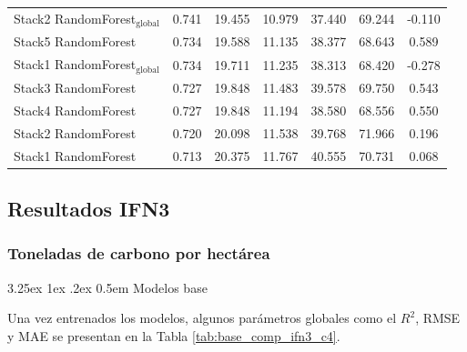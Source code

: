 \documentclass[a4paper,twocolumn]{article}
\makeatletter
\renewcommand\paragraph{\@startsection{paragraph}{4}{\z@}%
  {3.25ex \@plus1ex \@minus.2ex}%
  {0.5em}%
  {\normalfont\normalsize\bfseries}}
\newcommand{\subsubsubsection}[1]{\paragraph{#1}}
\makeatother
\begin{document}
\begin{table}
{\begin{tabular}{p{4.5cm}cccccc}
        Stack2 RandomForest$_{\text{global}}$ & 0.741 & 19.455 & 10.979 & 37.440 & 69.244 & -0.110 \\
        Stack5 RandomForest & 0.734 & 19.588 & 11.135 & 38.377 & 68.643 & 0.589 \\
        Stack1 RandomForest$_{\text{global}}$ & 0.734 & 19.711 & 11.235 & 38.313 & 68.420 & -0.278 \\
        Stack3 RandomForest & 0.727 & 19.848 & 11.483 & 39.578 & 69.750 & 0.543 \\
        Stack4 RandomForest & 0.727 & 19.848 & 11.194 & 38.580 & 68.556 & 0.550 \\
        Stack2 RandomForest & 0.720 & 20.098 & 11.538 & 39.768 & 71.966 & 0.196 \\
        Stack1 RandomForest & 0.713 & 20.375 & 11.767 & 40.555 & 70.731 & 0.068 \\
            \bottomrule
    \end{tabular}
    }
\end{table}

\subsection{Resultados IFN3}

\subsubsection{Toneladas de carbono por hectárea}

\subsubsubsection{Modelos base}

Una vez entrenados los modelos, algunos parámetros globales como el $R^2$, RMSE y MAE se presentan en la Tabla \ref{tab:base_comp_ifn3_c4}.
\end{document}
